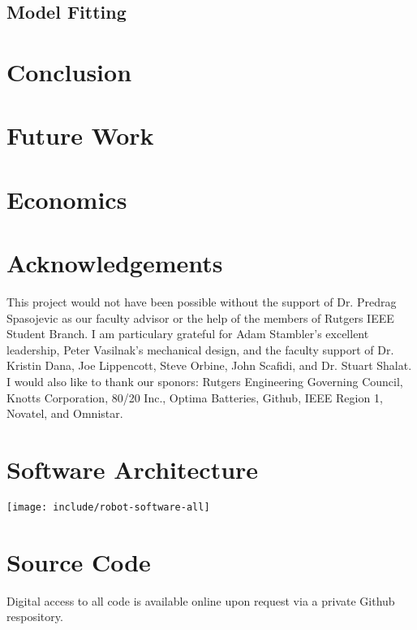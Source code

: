 \documentclass[11pt,twocolumn]{article}
\begin{document}

\subsection{Model Fitting}
\label{sec:line-model}


\section{Conclusion}
\label{sec:conclusion}

\section{Future Work}
\label{sec:future}

\section{Economics}
\label{sec:econ}

\section{Acknowledgements}
This project would not have been possible without the support of Dr. Predrag
Spasojevic as our faculty advisor or the help of the members of Rutgers IEEE
Student Branch. I am particulary grateful for Adam Stambler's excellent
leadership, Peter Vasilnak's mechanical design, and the faculty support of Dr.
Kristin Dana, Joe Lippencott, Steve Orbine, John Scafidi, and Dr. Stuart
Shalat. I would also like to thank our sponors: Rutgers Engineering Governing
Council, Knotts Corporation, 80/20 Inc., Optima Batteries, Github, IEEE Region
1, Novatel, and Omnistar.

\appendix
\section{Software Architecture}
\label{sec:robot-graph}
\begin{figure*}
	\centering
	\texttt{[image: include/robot-software-all]}
	\label{fig:robot-software-all}
\end{figure*}

\section{Source Code}
Digital access to all code is available online upon request via a private
Github respository.

\end{document}

